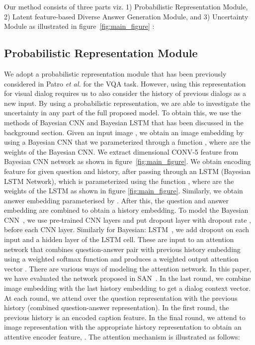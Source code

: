 \documentclass[review]{elsarticle}
\begin{document}
Our method consists of three parts viz. 1) Probabilistic Representation Module, 2) Latent feature-based Diverse Answer Generation Module, and 3) Uncertainty Module  as illustrated in figure~\ref{fig:main_figure} :

\subsection{Probabilistic Representation Module}
We adopt a probabilistic representation module that has been previously considered in Patro {\it et al.} \cite{Patro_ICCV2019} for the VQA task. However, using this representation for visual dialog requires us to also consider the history of previous dialogs as a new input. By using a probabilistic representation, we are able to investigate the uncertainty in any part of the full proposed model. To obtain this, we use the methods of Bayesian CNN and Bayesian LSTM that has been discussed in the background section. Given an input image , we obtain an image embedding  by using a Bayesian CNN that we parameterized through a function , where  are the weights of the Bayesian CNN. We extract  dimensional CONV-5 feature from Bayesian CNN network as shown in figure~\ref{fig:main_figure}. We obtain  encoding feature for given question and history, after passing through an LSTM (Bayesian LSTM Network), which is parameterized using the function , where  are the weights of the LSTM as shown in figure \ref{fig:main_figure}. Similarly, we obtain answer embedding  parameterised by . After this, the question and answer embedding are combined to obtain a history embedding. To model the Bayesian CNN~\cite{Gal_ARX2015}, we use pre-trained CNN layers and put dropout layer with dropout rate , before each CNN layer. Similarly for Bayesian: LSTM~\cite{Fortunato_Arxiv2017}, we add dropout on each input and a hidden layer of the LSTM cell. These are input to an attention network that combines question-answer pair with previous history embedding using a weighted softmax function and produces a weighted output attention vector . There are various ways of modeling the attention network. In this paper, we have evaluated the network proposed in SAN~\cite{Yang_CVPR2016}.  In the last round, we combine image embedding with the last history embedding to get a dialog context vector. At each round, we attend over the question representation with the previous history (combined question-answer representation). In the first round, the previous history is an encoded caption feature. In the final round, we attend to image representation with the appropriate history representation to obtain an attentive encoder feature, . The attention mechanism is illustrated as follows:
\end{document}
